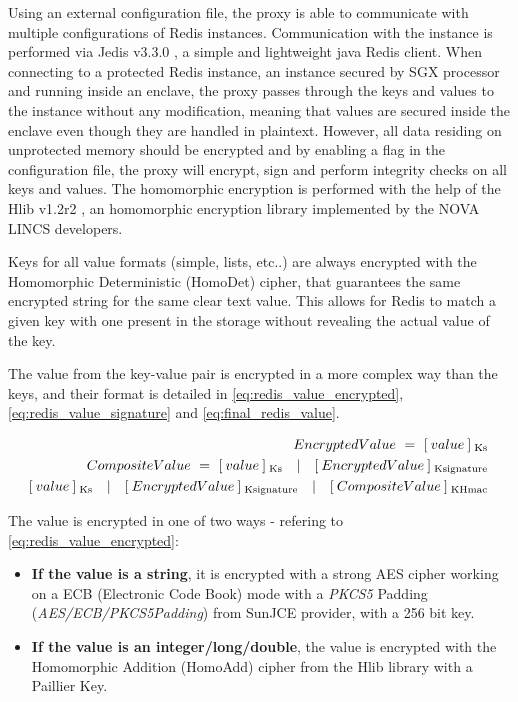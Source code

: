 Using an external configuration file, the proxy is able to communicate with multiple configurations of Redis instances. Communication with the instance is performed via Jedis v3.3.0 \cite{jedis:1}, a simple and lightweight java Redis client. When connecting to a protected Redis instance, an instance secured by \gls{SGX} processor and running inside an enclave, the proxy passes through the keys and values to the instance without any modification, meaning that values are secured inside the enclave even though they are handled in plaintext. However, all data residing on unprotected memory should be encrypted and by enabling a flag in the configuration file, the proxy will encrypt, sign and perform integrity checks on all keys and values. The homomorphic encryption is performed with the help of the Hlib v1.2r2 \cite{homolib:1}, an homomorphic encryption library implemented by the NOVA LINCS developers.

Keys for all value formats (simple, lists, etc..) are always encrypted with the Homomorphic Deterministic (HomoDet) cipher, that guarantees the same encrypted string for the same clear text value. This allows for Redis to match a given key with one present in the storage without revealing the actual value of the key.

The value from the key-value pair is encrypted in a more complex way than the keys, and their format is detailed in \ref{eq:redis_value_encrypted}, \ref{eq:redis_value_signature} and \ref{eq:final_redis_value}.

\begin{eqnarray}
EncryptedValue \  = \  [\: value \: ] \: \textsubscript{Ks} \label{eq:redis_value_encrypted} \\
CompositeValue \  = \  [\: value \: ] \: \textsubscript{Ks} \quad | \quad [\: EncryptedValue \: ] \: \textsubscript{Ksignature} \label{eq:redis_value_signature} \\
\![\: value \: ] \: \textsubscript{Ks} \quad | \quad [\: EncryptedValue \: ] \: \textsubscript{Ksignature} \quad | \quad [ \: CompositeValue \: ] \: \textsubscript{KHmac} \label{eq:final_redis_value}
\end{eqnarray}

The value is encrypted in one of two ways - refering to \ref{eq:redis_value_encrypted}:

\begin{itemize}
  \item \textbf{If the value is a string}, it is encrypted with a strong \gls{AES} cipher working on a \gls{ECB} (Electronic Code Book) mode with a \textit{PKCS5} Padding (\textit{AES/ECB/PKCS5Padding}) from SunJCE provider, with a 256 bit key.
  \item \textbf{If the value is an integer/long/double}, the value is encrypted with the Homomorphic Addition (HomoAdd) cipher from the Hlib library with a Paillier Key.
\end{itemize}

